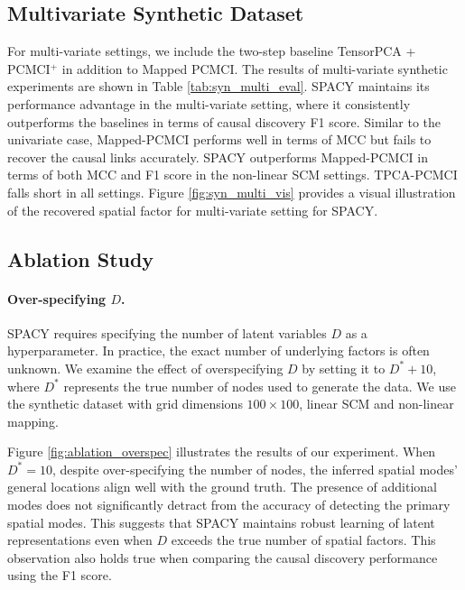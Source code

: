 \subsection{Multivariate Synthetic Dataset}


For multi-variate settings, we include the two-step baseline TensorPCA + PCMCI$^+$ \citep{babii2023tensorprincipalcomponentanalysis} in addition to Mapped PCMCI. The results of multi-variate synthetic experiments are shown in Table \ref{tab:syn_multi_eval}. SPACY maintains its performance advantage in the multi-variate setting, where it consistently outperforms the baselines in terms of causal discovery F1 score. Similar to the univariate case, Mapped-PCMCI performs well in terms of MCC but fails to recover the causal links accurately. SPACY outperforms Mapped-PCMCI in terms of both MCC and F1 score in the non-linear SCM settings. TPCA-PCMCI falls short in all settings. Figure \ref{fig:syn_multi_vis} provides a visual illustration of the recovered spatial factor for multi-variate setting for SPACY.


\subsection{Ablation Study} \label{sec:ablation_study}
% 

\paragraph{Over-specifying $D$. } SPACY requires specifying the number of latent variables $D$ as a hyperparameter. In practice, the exact number of underlying factors is often unknown. We examine the effect of overspecifying $D$ by setting it to $D^*+10$, where $D^*$ represents the true number of nodes used to generate the data.  We use the synthetic dataset with grid dimensions $100\times 100$, linear SCM and non-linear mapping.

Figure \ref{fig:ablation_overspec} illustrates the results of our experiment. When $D^* = 10$, despite over-specifying the number of nodes, the inferred spatial modes' general locations align well with the ground truth. The presence of additional modes does not significantly detract from the accuracy of detecting the primary spatial modes. This suggests that SPACY maintains robust learning of latent representations even when $D$ exceeds the true number of spatial factors. This observation also holds true when comparing the causal discovery performance using the F1 score. 

